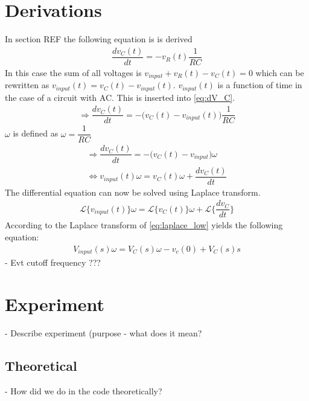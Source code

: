 \section{Derivations}
In section REF the following equation is is derived
\begin{align} \label{eq:dV_C}
\dfrac{dv_C(t)}{dt}=-v_R(t)\dfrac{1}{RC}
\end{align}
In this case the sum of all voltages is $v_{input}+v_R(t)-v_C(t)=0$ which can be rewritten as $v_{input}(t)=v_C(t)-v_{input}(t)$. $v_{input}(t)$ is a function of time in the case of a circuit with AC. This is inserted into \eqref{eq:dV_C}.
\begin{align}
\Rightarrow \dfrac{dv_C(t)}{dt}=-\Big(v_C(t)-v_{input}(t)\Big)\dfrac{1}{RC}
\end{align}
$\omega$ is defined as $\omega=\dfrac{1}{RC}$
\begin{align}
\Rightarrow \dfrac{dv_C(t)}{dt}=-\Big(v_C(t)-v_{input}\Big)\omega
\\
\Leftrightarrow v_{input}(t)\omega=v_C(t)\omega+\dfrac{dv_C(t)}{dt}
\end{align}
The differential equation can now be solved using Laplace transform.
\begin{align}\label{eq:laplace_low}
\mathcal{L}\Big\{v_{input}(t)\Big\}\omega=\mathcal{L}\Big\{v_C(t)\Big\}\omega+\mathcal{L}\bigg\{\dfrac{dv_C}{dt}\bigg\}
\end{align}
According to  the Laplace transform of \eqref{eq:laplace_low} yields the following equation:
\begin{align}
V_{input}(s)\omega=V_C(s)\omega-v_c(0)+V_C(s)s
\end{align} 
- Evt cutoff frequency ???
\section{Experiment}
- Describe experiment (purpose - what does it mean?
\subsection{Theoretical}
- How did we do in the code theoretically?
